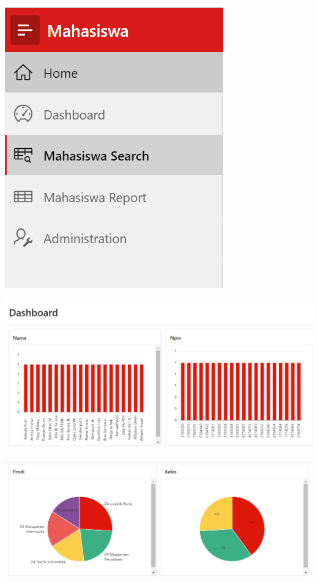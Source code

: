 \documentclass{article}
\begin{document}
\begin{enumerate}
   \begin{center}
    \includegraphics[width=.8\textwidth]{18.PNG}
\end{center}  
\begin{center}
    \includegraphics[width=.8\textwidth]{22.PNG}
\end{center}
\begin{center}
    \includegraphics[width=.8\textwidth]{23.PNG}

\end{center}
\end{enumerate}
\end{document}
